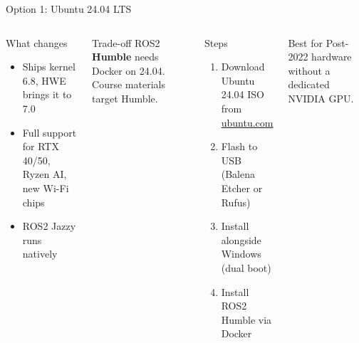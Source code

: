 \documentclass[aspectratio=169]{beamer}
\begin{document}
\begin{frame}{Option 1: Ubuntu 24.04 LTS}
  \begin{columns}
      \begin{block}{What changes}
        \begin{itemize}
          \item Ships kernel 6.8, \alert{HWE brings it to 7.0}
          \item Full support for RTX 40/50,
                Ryzen AI, new Wi-Fi chips
          \item ROS2 \alert{Jazzy} runs natively
        \end{itemize}
      \end{block}
      \vspace{0.3em}
      \begin{alertblock}{Trade-off}
        ROS2 \textbf{Humble} needs Docker on 24.04.
        Course materials target Humble.
      \end{alertblock}
      \begin{exampleblock}{Steps}
        \begin{enumerate}
          \item Download Ubuntu 24.04 ISO from \url{ubuntu.com}
          \item Flash to USB (Balena Etcher or Rufus)
          \item Install alongside Windows (dual boot)
          \item Install ROS2 Humble via Docker
        \end{enumerate}
      \end{exampleblock}
      \vspace{0.4em}
      \begin{block}{Best for}
        Post-2022 hardware without a dedicated NVIDIA GPU.
      \end{block}
  \end{columns}
\end{frame}
\end{document}

